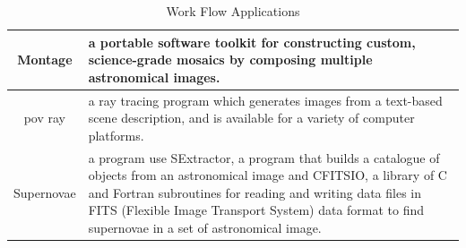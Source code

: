 \begin{table}
\centering
\begin{tabular}{|c|p{150pt}|}
\hline
Montage		&		a portable software toolkit for constructing custom, science-grade 
mosaics by composing multiple astronomical images\cite{montage}.\\\hline
pov ray		&		a ray tracing program which generates images from a text-based scene description, and is
available for a variety of computer platforms\cite{povray}.\\\hline
Supernovae	&	a program use SExtractor\cite{SExtractor}, a program that builds a catalogue of objects
from an astronomical image and CFITSIO\cite{fitsio},  a library of C and Fortran subroutines for
reading and writing data files in FITS (Flexible Image Transport System) data format to find supernovae in a set of
astronomical image.\\
\hline
\end{tabular}
\caption{Work Flow Applications}
\label{background:work flow applications}
\end{table}


